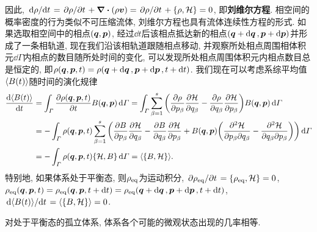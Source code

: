 因此, $ \dv*{\rho}{t} = \pdv*{\rho}{t}+ \div{(\rho \vb*{v})} = \pdv*{\rho}{t}+\pb{\rho}{\hami} = 0 $, 即\textbf{刘维尔方程}. 相空间的概率密度的行为类似不可压缩流体, 刘维尔方程也具有流体连续性方程的形式. 如果选取相空间中的相点$ (\vb*{q},\vb*{p}) $, 经过$ \dd{t} $后该相点抵达新的相点$ (\vb*{q}+\dd{\vb*{q}},\vb*{p}+\dd{\vb*{p}}) $并形成了一条相轨道, 现在我们沿该相轨道跟随相点移动, 并观察所处相点周围相体积元$ \dd{\varGamma} $内相点的数目随所处时间的变化, 可以发现所处相点周围体积元内相点数目总是恒定的, 即$ \rho(\vb*{q},\vb*{p},t)=\rho(\vb*{q}+\dd{\vb*{q}},\vb*{p}+\dd{\vb*{p}},t+\dd{t}) $. 我们现在可以考虑系综平均值$ \langle B(t)\rangle $随时间的演化规律
\begin{align*}
    \dv{\avg{B(t)}}{t} &= \int_{\varGamma} \pdv{\rho(\vb*{q},\vb*{p},t)}{t} B(\vb*{q},\vb*{p}) \dd{\varGamma} = \int_{\varGamma} \sum_{\beta=1}^s \bigg(\pdv{\rho}{p_{\beta}} \pdv{\hami}{q_{\beta}} - \pdv{\rho}{q_{\beta}} \pdv{\hami}{p_{\beta}} \bigg) B(\vb*{q},\vb*{p}) \dd{\varGamma}\\
    &=-\int_{\varGamma} \rho(\vb*{q},\vb*{p},t) \sum_{\beta=1}^s \bigg(\pdv{B}{p_{\beta}} \pdv{\hami}{q_{\beta}} - \pdv{B}{q_{\beta}} \pdv{\hami}{p_{\beta}} + B(\vb*{q},\vb*{p})\bigg( \pdv{\hami}{p_{\beta}}{q_{\beta}} - \pdv{\hami}{q_{\beta}}{p_{\beta}} \bigg) \bigg) \dd{\varGamma}\\
    &=-\int_{\varGamma} \rho(\vb*{q},\vb*{p},t) \pb{\hami}{B} \dd{\varGamma} = \avg{\pb{B}{\hami}}.
\end{align*}
特别地, 如果体系处于平衡态, 则$ \rho_{\mathrm{eq}} $为运动积分, $ \pdv*{\rho_{\eqv}}{t}=\pb{\rho_{\eqv}}{\hami}=0 $, $ \rho_{\mathrm{eq}}(\vb*{q},\vb*{p},t)=\rho_{\mathrm{eq}}(\vb*{q},\vb*{p},t+\dd{t})=\rho_{\mathrm{eq}}(\vb*{q}+\dd{\vb*{q}},\vb*{p}+\dd{\vb*{p}},t+\dd{t}) $, $ \dv*{\avg{B(t)}}{t}=\avg{\pb{B}{\hami}}=0 $.




\begin{postulate}[等几率原理]\label{pos:等几率原理}
    对处于平衡态的孤立体系, 体系各个可能的微观状态出现的几率相等.
\end{postulate}

